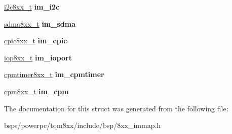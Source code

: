 \begin{DoxyCompactItemize}
\mbox{\hyperlink{structi2c}{i2c8xx\+\_\+t}} {\bfseries im\+\_\+i2c}
\item 
\mbox{\label{structimmap_a2f000d873311787fe88b3e7ecba7e51d}} 
\mbox{\hyperlink{structsdma__csr}{sdma8xx\+\_\+t}} {\bfseries im\+\_\+sdma}
\item 
\mbox{\label{structimmap_af1c236f50e6cf49fc53ff344122dbe07}} 
\mbox{\hyperlink{structcpm__ic}{cpic8xx\+\_\+t}} {\bfseries im\+\_\+cpic}
\item 
\mbox{\label{structimmap_a15e639afd1a6940bffc5ae8ed4decc44}} 
\mbox{\hyperlink{structio__port}{iop8xx\+\_\+t}} {\bfseries im\+\_\+ioport}
\item 
\mbox{\label{structimmap_a52190ef8f0a183feeafd02388ffc1ae2}} 
\mbox{\hyperlink{structcpm__timers}{cpmtimer8xx\+\_\+t}} {\bfseries im\+\_\+cpmtimer}
\item 
\mbox{\label{structimmap_a894fdd627978840653567e88174faaec}} 
\mbox{\hyperlink{structcomm__proc}{cpm8xx\+\_\+t}} {\bfseries im\+\_\+cpm}
\end{DoxyCompactItemize}


The documentation for this struct was generated from the following file\+:\begin{DoxyCompactItemize}
\item 
bsps/powerpc/tqm8xx/include/bsp/8xx\+\_\+immap.\+h\end{DoxyCompactItemize}
